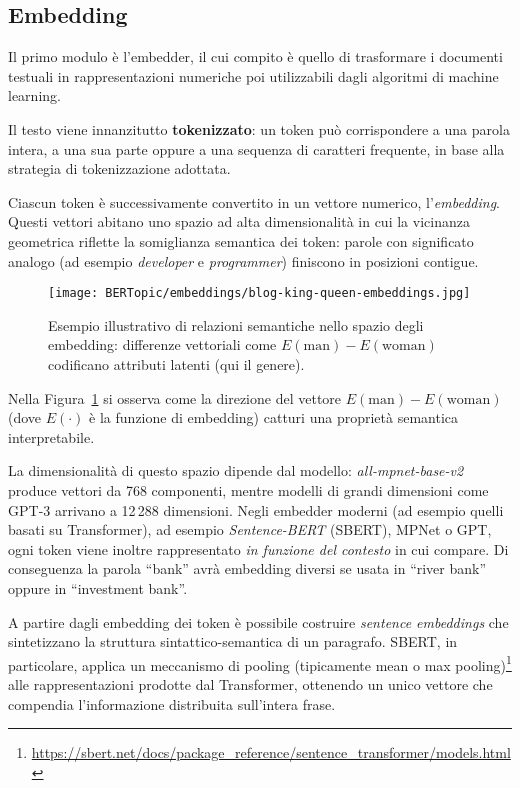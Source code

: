 \subsection{Embedding}
Il primo modulo è l’embedder, il cui compito è quello di trasformare i documenti testuali in rappresentazioni numeriche poi utilizzabili dagli algoritmi di machine learning.

\noindent Il testo viene innanzitutto \textbf{tokenizzato}: un token può corrispondere a una parola intera, a una sua parte oppure a una sequenza di caratteri frequente, in base alla strategia di tokenizzazione adottata.

\noindent Ciascun token è successivamente convertito in un vettore numerico, l’\textit{embedding}. Questi vettori abitano uno spazio ad alta dimensionalità in cui la vicinanza geometrica riflette la somiglianza semantica dei token: parole con significato analogo (ad esempio \textit{developer} e \textit{programmer}) finiscono in posizioni contigue.

\begin{figure}[H]
\centering
\texttt{[image: BERTopic/embeddings/blog-king-queen-embeddings.jpg]}
\caption{Esempio illustrativo di relazioni semantiche nello spazio degli embedding: differenze vettoriali come $E(\text{man})-E(\text{woman})$ codificano attributi latenti (qui il genere).}
\label{fig:embedding-analogy}
\end{figure}

\noindent Nella Figura~\ref{fig:embedding-analogy} si osserva come la direzione del vettore $E(\text{man})-E(\text{woman})$ (dove $E(\cdot)$ è la funzione di embedding) catturi una proprietà semantica interpretabile.

\noindent La dimensionalità di questo spazio dipende dal modello: \textit{all-mpnet-base-v2} produce vettori da 768 componenti, mentre modelli di grandi dimensioni come GPT-3 arrivano a 12\,288 dimensioni. Negli embedder moderni (ad esempio quelli basati su Transformer), ad esempio \textit{Sentence-BERT} (SBERT), MPNet o GPT, ogni token viene inoltre rappresentato \textit{in funzione del contesto} in cui compare. Di conseguenza la parola “bank” avrà embedding diversi se usata in “river bank” oppure in “investment bank”.

\noindent A partire dagli embedding dei token è possibile costruire \textit{sentence embeddings} che sintetizzano la struttura sintattico-semantica di un paragrafo. SBERT, in particolare, applica un meccanismo di pooling (tipicamente mean o max pooling)\footnote{\url{https://sbert.net/docs/package_reference/sentence_transformer/models.html}} alle rappresentazioni prodotte dal Transformer, ottenendo un unico vettore che compendia l’informazione distribuita sull’intera frase.

